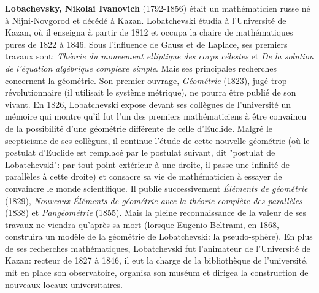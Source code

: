 \textbf{Lobachevsky, Nikolai Ivanovich} (1792-1856) était un mathématicien russe né à Nijni-Novgorod et décédé à Kazan. Lobatchevski étudia à l'Université de Kazan, où il enseigna à partir de 1812 et occupa la chaire de mathématiques pures de 1822 à 1846. Sous l'influence de Gauss et de Laplace, ses premiers travaux sont: \textit{Théorie du mouvement elliptique des corps célestes} et \textit{De la solution de l'équation algébrique complexe simple}. Mais ses principales recherches concernent la géométrie. Son premier ouvrage, \textit{Géométrie} (1823), jugé trop révolutionnaire (il utilisait le système métrique), ne pourra être publié de son vivant. En 1826, Lobatchevski expose devant ses collègues de l'université un mémoire qui montre qu'il fut l'un des premiers mathématiciens à être convaincu de la possibilité d'une géométrie différente de celle d'Euclide. Malgré le scepticisme de ses collègues, il continue l'étude de cette nouvelle géométrie (où le postulat d'Euclide est remplacé par le postulat suivant, dit "postulat de Lobatchevski": par tout point extérieur à une droite, il passe une infinité de parallèles à cette droite) et consacre sa vie de mathématicien à essayer de convaincre le monde scientifique. Il publie successivement \textit{Éléments de géométrie} (1829), \textit{Nouveaux Éléments de géométrie avec la théorie complète des parallèles} (1838) et \textit{Pangéométrie} (1855). Mais la pleine reconnaissance de la valeur de ses travaux ne viendra qu'après sa mort (lorsque Eugenio Beltrami, en 1868, construira un modèle de la géométrie de Lobatchevski: la pseudo-sphère). En plus de ses recherches mathématiques, Lobatchevski fut l'animateur de l'Université de Kazan: recteur de 1827 à 1846, il eut la charge de la bibliothèque de l'université, mit en place son observatoire, organisa son muséum et dirigea la construction de nouveaux locaux universitaires.

